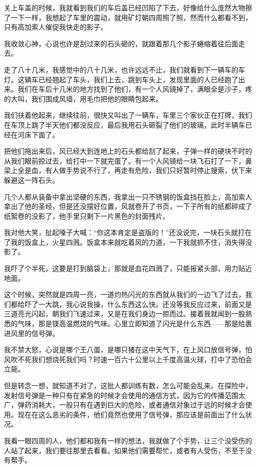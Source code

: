 关上车盖的时候，我就看到我们的车后盖已经凹陷了下去，好像给什么庞然大物擦了一下一样，我想起了车里的震动，就用矿灯朝四周照了照，然而什么都看不到，只有高加索人催促我快走的影子。

我收敛心神，心说也许是刮过来的石头砸的，就跟着那几个影子蜷缩着往后面走去。

走了八十几米，我感觉中的八十几米，也许远远不止，我们就看到下一辆车的车灯。这辆车已经翘起了车头，我们上去，跳到车头上，发现里面的人已经跑了出来。我们在车后十几米的地方找到了他们，有一个人风镜掉了，满眼全是沙子，疼的大叫，我们围成风墙，用毛巾把他的眼睛包起来。

我们扶着他起来，继续往前，很快又叫出了一辆车，车里三个家伙正在打牌，我们在车顶上跳了半天他们都没反应，最后我用石头砸裂了他们的玻璃，此时半辆车已经在河床下面了。

把他们拖出来后，风已经大到连地上的石头都给刮了起来，子弹一样的硬块不时的从我们眼前掠过去，给打中一下就完蛋了。有一个人风镜给一块飞石打了一下，鼻梁上全是血，有人做手势说不行了，再走有危险，我们只好暂时停止搜索，伏下来躲避这一阵石头。

几个人都从装备中拿出坚硬的东西，我拿出一只不锈钢的饭盒挡在脸上，高加索人拿出了他的圣经，但是还没摆好位置，风就卷开了书页，一下子所有的纸都碎成了纸絮卷的没影了，他手里只剩下一片黑色的封面残片。

我对他大笑，扯起嗓子大喊：“你这本肯定是盗版的！”还没说完，一块石头就打在了我的饭盒上，火星四溅。饭盒本来就吃着风的力道，一下我就抓不住，消失得没影了。

我吓了个半死，这要是打到脑袋上，那就是血花四溅了，只能报紧头部，用力贴近地面。

这个时候，突然就是四周一亮，一道灼热闪光的东西就从我们的一边飞了过去，我们都给吓了一大跳，我心说我操，什么东西这么快。还没等我反应过来，前面又是三道亮光闪起，朝我们飞速过来，又是在我们身边一掠而过。接着我就闻到一股熟悉的气味，那是镁高温燃烧的气味。心里立即知道了闪光是什么东西——那是给裹进风里的信号弹。

我不禁大怒，心说是哪个王八蛋，是哪只猪在这中天气下，在上风口放信号弹，怕风吹不死我们想烧死我们吗？时速一百六十公里以上千度高温火球，打中了恐怕会立毙。

但是转念一想，就知道不对了，这批人都训练有数，怎么可能会乱来。在探险中，发射信号弹是一种只有在紧急的时候才会使用的通信方式，因为它的传播范围太广，弹药消耗大，一般只有在遇到巨大的危险，或者通信对象过于远的时候才会使用。现在在这么恶劣的条件，他们竟然也使用了信号弹，那应该是前面出了什么状况。

我看一眼四周的人，他们都和我有一样的想法，我就做了个手势，让三个没受伤的人站了起来，我们要往那里去看看。如果他们需要帮忙，或者有人受伤，不至于没有帮手。

